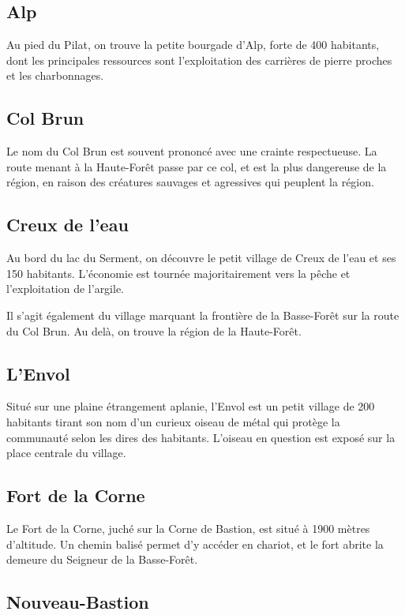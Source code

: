 \documentclass[10pt,twoside,twocolumn,openany,bg=print,justified]{dndbook}
\begin{document}
\subsection*{Alp}

Au pied du Pilat, on trouve la petite bourgade d'Alp, forte de 400 habitants, dont les principales ressources sont l'exploitation des carrières de pierre proches et les charbonnages.

\subsection*{Col Brun}

Le nom du Col Brun est souvent prononcé avec une crainte respectueuse. La route menant à la Haute-Forêt passe par ce col, et est la plus dangereuse de la région, en raison des créatures sauvages et agressives qui peuplent la région.

\subsection*{Creux de l'eau}

Au bord du lac du Serment, on découvre le petit village de Creux de l'eau et ses 150 habitants. L'économie est tournée majoritairement vers la pêche et l'exploitation de l'argile.

Il s'agit également du village marquant la frontière de la Basse-Forêt sur la route du Col Brun. Au delà, on trouve la région de la Haute-Forêt.

\subsection*{L'Envol}

Situé sur une plaine étrangement aplanie, l'Envol est un petit village de 200 habitants tirant son nom d'un curieux oiseau de métal qui protège la communauté selon les dires des habitants. L'oiseau en question est exposé sur la place centrale du village.

\subsection*{Fort de la Corne}

Le Fort de la Corne, juché sur la Corne de Bastion, est situé à 1900 mètres d'altitude. Un chemin balisé permet d'y accéder en chariot, et le fort abrite la demeure du Seigneur de la Basse-Forêt.

\subsection*{Nouveau-Bastion}
\end{document}
